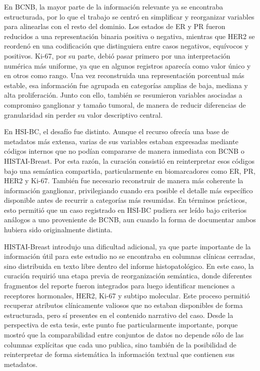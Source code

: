 En BCNB, la mayor parte de la información relevante ya se encontraba estructurada, por lo que el trabajo se centró en simplificar y reorganizar variables para alinearlas con el resto del dominio. Los estados de ER y PR fueron reducidos a una representación binaria positiva o negativa, mientras que HER2 se reordenó en una codificación que distinguiera entre casos negativos, equívocos y positivos. Ki-67, por su parte, debió pasar primero por una interpretación numérica más uniforme, ya que en algunos registros aparecía como valor único y en otros como rango. Una vez reconstruida una representación porcentual más estable, esa información fue agrupada en categorías amplias de baja, mediana y alta proliferación. Junto con ello, también se resumieron variables asociadas a compromiso ganglionar y tamaño tumoral, de manera de reducir diferencias de granularidad sin perder su valor descriptivo central.

En HSI-BC, el desafío fue distinto. Aunque el recurso ofrecía una base de metadatos más extensa, varias de sus variables estaban expresadas mediante códigos internos que no podían compararse de manera inmediata con BCNB o HISTAI-Breast. Por esta razón, la curación consistió en reinterpretar esos códigos bajo una semántica compartida, particularmente en biomarcadores como ER, PR, HER2 y Ki-67. También fue necesario reconstruir de manera más coherente la información ganglionar, privilegiando cuando era posible el detalle más específico disponible antes de recurrir a categorías más resumidas. En términos prácticos, esto permitió que un caso registrado en HSI-BC pudiera ser leído bajo criterios análogos a uno proveniente de BCNB, aun cuando la forma de documentar ambos hubiera sido originalmente distinta.

HISTAI-Breast introdujo una dificultad adicional, ya que parte importante de la información útil para este estudio no se encontraba en columnas clínicas cerradas, sino distribuida en texto libre dentro del informe histopatológico. En este caso, la curación requirió una etapa previa de reorganización semántica, donde diferentes fragmentos del reporte fueron integrados para luego identificar menciones a receptores hormonales, HER2, Ki-67 y subtipo molecular. Este proceso permitió recuperar atributos clínicamente valiosos que no estaban disponibles de forma estructurada, pero sí presentes en el contenido narrativo del caso. Desde la perspectiva de esta tesis, este punto fue particularmente importante, porque mostró que la comparabilidad entre conjuntos de datos no depende sólo de las columnas explícitas que cada uno publica, sino también de la posibilidad de reinterpretar de forma sistemática la información textual que contienen sus metadatos.

